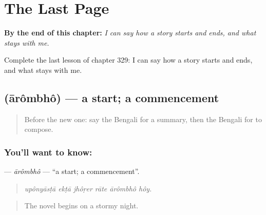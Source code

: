 
\chapter{The Last Page}
\label{ch:bn-the-last-page}

\begin{chapteropening}
\textbf{By the end of this chapter:} \emph{I can say how a story starts and ends, and what stays with me.}

Complete the last lesson of chapter 329: I can say how a story starts and ends, and what stays with me.
\end{chapteropening}

\section[\texorpdfstring{\bn{আরম্ভ} (ārômbhô)}{আরম্ভ (ārômbhô)}]{ (ārômbhô) — a start; a commencement}

\label{lesson:BN-C329-arombho}



\begin{quote}
Before the new one: say the Bengali for a summary, then the Bengali for to compose.
\end{quote}

\subsection*{You'll want to know: }
\textbf{} — \emph{ārômbhô} — \textquotedblleft{}a start; a commencement\textquotedblright{}.

\begin{quote}
     
\end{quote}

\begin{quote}
\emph{upônyāsṭā ekṭā jhôṛer rāte ārômbhô hôy.}
\end{quote}

\begin{quote}
The novel begins on a stormy night.
\end{quote}

